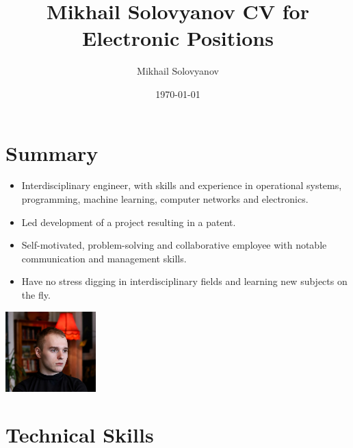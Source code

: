 \documentclass{article}
\title{ Mikhail Solovyanov CV for Electronic Positions}
\author{Mikhail Solovyanov}
\date{\today}
\begin{document}
 
\makecvtitle %

\section{Summary}
\begin{minipage}{0.7\textwidth}
   \begin{itemize}
      \item Interdisciplinary engineer,  with skills and experience in operational systems, programming, machine learning, computer networks and electronics.
      \item Led development of a project resulting in a patent.
      \item Self-motivated, problem-solving and collaborative employee with notable communication and management skills.
      \item Have no stress digging in interdisciplinary fields and learning new subjects on the fly.
      \end{itemize}
   \end{minipage}%
   \hfill
   \begin{minipage}{0.3\textwidth}
      \includegraphics[width=3.5cm,right]{picture.jpg}
\end{minipage}%





\section{Technical Skills}
 
\end{document}
